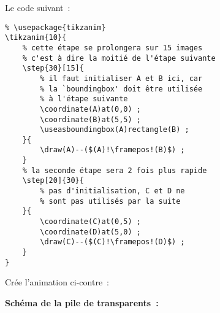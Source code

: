 \documentclass[a4paper,12pt]{article}
\begin{document}
	\begin{multicols}{2}
	{Le code suivant~:}
	\begin{lstlisting}
% \usepackage{tikzanim}
\tikzanim{10}{
	% cette étape se prolongera sur 15 images
	% c'est à dire la moitié de l'étape suivante
	\step{30}[15]{
		% il faut initialiser A et B ici, car
		% la `boundingbox' doit être utilisée
		% à l'étape suivante
		\coordinate(A)at(0,0) ;
		\coordinate(B)at(5,5) ;
		\useasboundingbox(A)rectangle(B) ;
	}{
		\draw(A)--($(A)!\framepos!(B)$) ;
	}
	% la seconde étape sera 2 fois plus rapide
	\step[20]{30}{
		% pas d'initialisation, C et D ne
		% sont pas utilisés par la suite
	}{
		\coordinate(C)at(0,5) ;
		\coordinate(D)at(5,0) ;
		\draw(C)--($(C)!\framepos!(D)$) ;
	}
}
	\end{lstlisting}
	
	{Crée l'animation ci-contre~:}
	
	\bigskip
	
	\centering
	
	\end{multicols}
	
	\textbf{Schéma de la pile de transparents~:}
	
	\medskip
	
\newcommand{\transparentliste}[2]{
	\stepcounter{dy}	
	\foreach\f in {#1}{
		\pgfmathsetmacro{\c}{\f*5}
		\path[draw=black,fill=teal!\c!purple!75!white,fill opacity=0.75] (\f*0.1,-\thedy*0.8)node(a){} -- ++(0,0.6) -- ++(0.3,0.3)node(b){} -- ++(0,-0.6) -- cycle ;
		\path(a)--node[midway,font=\tiny,shape=rectangle]{\f} (b) ;
	}
	\node[anchor=west,shape=rectangle] at(2.5,0.4-\thedy*0.8) {#2#1} ;
}

\newcommand{\acc}[4][0pt]{
		\draw[decorate,decoration={brace,amplitude=10pt},thick,xshift=#1] (12,-0.8*#2-0.05) --node[right,xshift=10pt,text width=6cm,font=\ttfamily,shape=rectangle]{#4} (12,-0.8*#3+0.05);
}

\newcommand{\entoure}[4][]{
	\filldraw[red,thick,densely dashed,fill opacity=0.333,#1] (#2*0.1-0.05,-#4*0.8-0.125) -- ++(0,{(#4-#3+1)*0.8-0.05}) -- ++(0.4,0.4) -- ++ (0,{-(#4-#3+1)*0.8+0.05}) -- cycle ;
}
\end{document}
